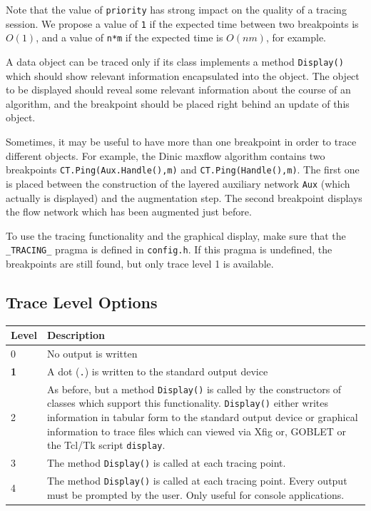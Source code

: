 \documentclass[a4paper,11pt,twoside]{book}
\begin{document}
\begin{multicols}{2}
Note that the value of \verb/priority/ has strong impact on the quality of
a tracing session. We propose a value of \verb/1/ if the expected time
between two breakpoints is $O(1)$, and a value of \verb/n*m/ if the expected
time is $O(nm)$, for example.

A data object can be traced only if its class implements a
method \verb/Display()/ which should show relevant information
encapsulated into the object.
The object to be displayed should reveal some relevant information about the
course of an algorithm, and the breakpoint should be placed right behind an
update of this object.

Sometimes, it may be useful to have more than one breakpoint in order to trace
different objects. For example, the Dinic maxflow algorithm contains two
breakpoints \verb/CT.Ping(Aux.Handle(),m)/ and \verb/CT.Ping(Handle(),m)/.
The first one is placed between the construction of the layered auxiliary
network \verb/Aux/ (which actually is displayed) and the augmentation step.
The second breakpoint displays the flow network which has been augmented just
before.

To use the tracing functionality and the graphical display, make sure that the
\verb/_TRACING_/ pragma is defined in \verb/config.h/. If this pragma is
undefined, the breakpoints are still found, but only trace level 1 is available.


\subsection{Trace Level Options}
\label{slb_trace_level}
\medskip
\begin{center}
\begin{tabular}{|p{1.5cm}|p{10.5cm}|}
\hline
{\bf Level} & {\bf Description} \\
\hline
\hline
0 & No output is written \\
\hline
{\bf 1} & A dot (\verb/./) is written to the standard output device \\
\hline
2 & As before, but a method \verb/Display()/ is called by the constructors
    of classes which support this functionality.
    \verb/Display()/ either writes information in tabular form
    to the standard output device or graphical information to
    trace files which can viewed via Xfig or, GOBLET or the Tcl/Tk script
    \verb/display/. \\
\hline
3 & The method \verb/Display()/ is called at each tracing point. \\
\hline
4 & The method \verb/Display()/ is called at each tracing point.
    Every output must be prompted by the user. Only useful
    for console applications. \\
\hline
\end{tabular}
\end{center}
\bigskip



\end{multicols}
\end{document}
